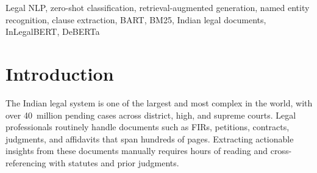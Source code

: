 \documentclass[conference]{IEEEtran}
\begin{document}
\begin{abstract}
The Indian judiciary processes millions of legal documents annually across
diverse domains including criminal law, civil disputes, contract law, family
law, property rights, constitutional matters, intellectual property, and labour
law. Manual analysis of these documents demands significant legal expertise and
is both time-consuming and error-prone. This paper presents an automated
multi-domain legal document analysis system that integrates transformer-based
zero-shot classification, named entity recognition (NER), clause identification,
extractive and abstractive summarization, and retrieval-augmented generation
(RAG). The system employs BART-large-mnli for zero-shot classification,
achieving 87.5\% accuracy across eight Indian legal case categories without
domain-specific fine-tuning. A BM25-based retrieval engine augmented by a
ChromaDB vector store searches a curated corpus of 80 Indian court cases,
improving retrieval Match@1 from 88.7\% (keyword baseline) to 100\% with RAG.
The pipeline processes PDF, DOCX, and plain-text documents through a FastAPI
backend and presents results via a React/Next.js interface. Experimental
evaluation on 80 labeled queries demonstrates that combining transformer-based
classification with retrieval-augmented generation significantly enhances the
contextual relevance of legal document analysis for Indian court cases.
\end{abstract}

\begin{IEEEkeywords}
Legal NLP, zero-shot classification, retrieval-augmented generation,
named entity recognition, clause extraction, BART, BM25, Indian legal documents,
InLegalBERT, DeBERTa
\end{IEEEkeywords}

\section{Introduction}

The Indian legal system is one of the largest and most complex in the world,
with over 40~million pending cases across district, high, and supreme courts.
Legal professionals routinely handle documents such as FIRs, petitions,
contracts, judgments, and affidavits that span hundreds of pages. Extracting
actionable insights from these documents manually requires hours of reading
and cross-referencing with statutes and prior judgments.
\end{document}
